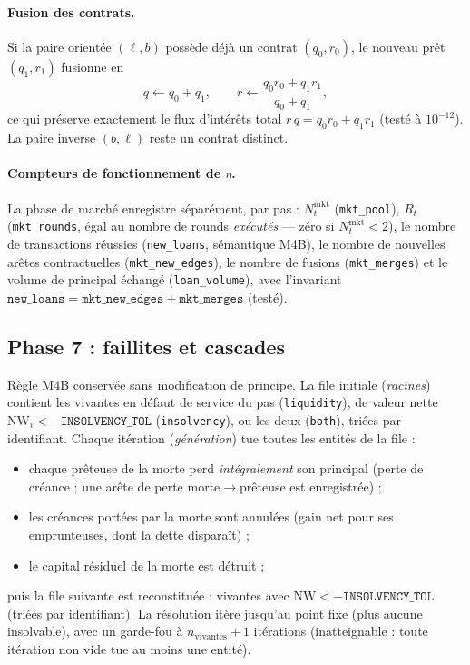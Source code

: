 \documentclass[11pt,a4paper]{article}
\newcommand{\code}[1]{\texttt{#1}}
\newcommand{\NW}{\mathrm{NW}}
\begin{document}
\paragraph{Fusion des contrats.}
\label{sec:merge}
Si la paire orientée $(\ell,b)$ possède déjà un contrat $(q_0,r_0)$, le
nouveau prêt $(q_1,r_1)$ fusionne en
\begin{equation}
q\leftarrow q_0+q_1,\qquad
r\leftarrow \frac{q_0 r_0+q_1 r_1}{q_0+q_1},
\end{equation}
ce qui préserve exactement le flux d'intérêts total $r\,q=q_0r_0+q_1r_1$
(testé à $10^{-12}$). La paire inverse $(b,\ell)$ reste un contrat
distinct.

\paragraph{Compteurs de fonctionnement de $\eta$.}
La phase de marché enregistre séparément, par pas :
$N^{\mathrm{mkt}}_t$ (\code{mkt\_pool}), $R_t$ (\code{mkt\_rounds},
égal au nombre de rounds \emph{exécutés} — zéro si $N^{\mathrm{mkt}}_t<2$),
le nombre de transactions réussies (\code{new\_loans}, sémantique M4B), le
nombre de nouvelles arêtes contractuelles (\code{mkt\_new\_edges}), le
nombre de fusions (\code{mkt\_merges}) et le volume de principal échangé
(\code{loan\_volume}), avec l'invariant
$\code{new\_loans}=\code{mkt\_new\_edges}+\code{mkt\_merges}$ (testé).

\subsection{Phase 7 : faillites et cascades}

Règle M4B conservée sans modification de principe. La file initiale
(\emph{racines}) contient les vivantes en défaut de service du pas
(\code{liquidity}), de valeur nette $\NW_i<-\code{INSOLVENCY\_TOL}$
(\code{insolvency}), ou les deux (\code{both}), triées par identifiant.
Chaque itération (\emph{génération}) tue toutes les entités de la file :
\begin{itemize}
\item chaque prêteuse de la morte perd \emph{intégralement} son principal
      (perte de créance ; une arête de perte morte$\to$prêteuse est
      enregistrée) ;
\item les créances portées par la morte sont annulées (gain net pour ses
      emprunteuses, dont la dette disparaît) ;
\item le capital résiduel de la morte est détruit ;
\end{itemize}
puis la file suivante est reconstituée : vivantes avec
$\NW<-\code{INSOLVENCY\_TOL}$ (triées par identifiant). La résolution
itère jusqu'au point fixe (plus aucune insolvable), avec un garde-fou à
$n_{\mathrm{vivantes}}+1$ itérations (inatteignable : toute itération non
vide tue au moins une entité).
\end{document}
